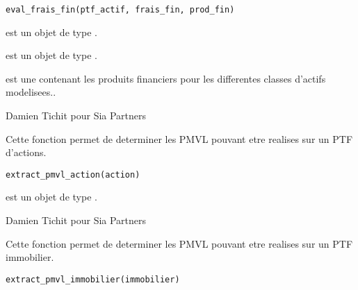 \documentclass[a4paper]{book}
\begin{document}
%
\begin{Usage}
\begin{verbatim}
eval_frais_fin(ptf_actif, frais_fin, prod_fin)
\end{verbatim}
\end{Usage}
%
\begin{Arguments}
\begin{ldescription}
\item[\code{ptf\_actif}] est un objet de type .

\item[\code{frais\_fin}] est un objet de type .

\item[\code{prod\_fin}] est une  contenant les produits financiers pour les differentes classes d'actifs modelisees..
\end{ldescription}
\end{Arguments}
%
\begin{Author}\relax
Damien Tichit pour Sia Partners
\end{Author}
%
\begin{Description}\relax
Cette fonction permet de determiner les PMVL pouvant etre realises sur un PTF d'actions.
\end{Description}
%
\begin{Usage}
\begin{verbatim}
extract_pmvl_action(action)
\end{verbatim}
\end{Usage}
%
\begin{Arguments}
\begin{ldescription}
\item[\code{action}] est un objet de type .
\end{ldescription}
\end{Arguments}
%
\begin{Author}\relax
Damien Tichit pour Sia Partners
\end{Author}
%
\begin{Description}\relax
Cette fonction permet de determiner les PMVL pouvant etre realises sur un PTF immobilier.
\end{Description}
%
\begin{Usage}
\begin{verbatim}
extract_pmvl_immobilier(immobilier)
\end{verbatim}
\end{Usage}
\end{document}
